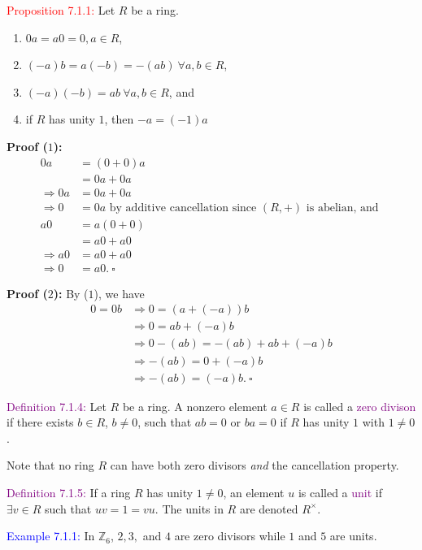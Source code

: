 \documentclass{article}
\begin{document}
\textcolor{red}{Proposition 7.1.1:} Let $R$ be a ring.
\begin{enumerate}
    \item $0a = a0 = 0, a \in R$,
    \item $(-a)b = a(-b) = -(ab) \ \forall a,b \in R$,
    \item $(-a)(-b) = ab \ \forall a,b \in R$, and 
    \item if $R$ has unity $1$, then $-a = (-1)a$
\end{enumerate}

\textbf{Proof ($1$):} \begin{align*}
    0a &= (0+0)a \\
    &= 0a+0a \\
    \Longrightarrow 0a &= 0a + 0a \\
    \Longrightarrow 0 &= 0a \text{ by additive cancellation since } (R,+) \text{ is abelian, and }\\
    a0 &= a(0+0) \\
    &= a0 + a0 \\
    \Longrightarrow a0 &= a0 + a0 \\
    \Longrightarrow 0 &= a0. \ \square 
\end{align*}

\textbf{Proof ($2$):} By ($1$), we have
\begin{align*}
    0 = 0b &\Longrightarrow 0 = (a+(-a))b \\
    &\Longrightarrow 0 = ab + (-a)b \\
    &\Longrightarrow 0 - (ab) = -(ab) + ab + (-a)b \\
    &\Longrightarrow -(ab) = 0+(-a)b \\
    &\Longrightarrow -(ab) = (-a)b. \ \square
\end{align*}

\textcolor{purple}{Definition 7.1.4:} Let $R$ be a ring. A nonzero element $a \in R$ is called a \textcolor{purple}{zero divison} if there 
exists $b \in R$, $b \neq 0$, such that $ab = 0$ or $ba = 0$ if $R$ has unity $1$ with $1 \neq 0$.

Note that no ring $R$ can have both zero divisors \textit{and} the cancellation property.

\textcolor{purple}{Definition 7.1.5:} If a ring $R$ has unity $1 \neq 0$, an element $u$ is called a \textcolor{purple}{unit} if 
$\exists v \in R$ such that $uv = 1 = vu$. The units in $R$ are denoted $R^{\times}$.

\textcolor{blue}{Example 7.1.1:} In $\mathbb{Z}_6$, $2,3,$ and $4$ are zero divisors while $1$ and $5$ are units.
\end{document}
